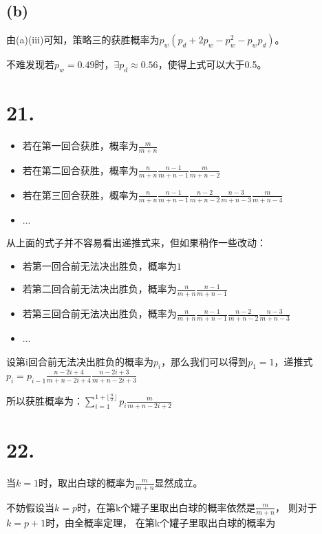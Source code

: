 \documentclass[UTF8]{article}
\begin{document}
        \subsection*{(b)}
            由(a)(iii)可知，策略三的获胜概率为$p_w(p_d + 2p_w - p_w^2 - p_wp_d)$。
            
            不难发现若$p_w = 0.49$时，$\exists p_d \approx 0.56$，使得上式可以大于0.5。
    \section*{21.}
        \begin{itemize}
            \item 若在第一回合获胜，概率为$\frac{m}{m + n}$
            \item 若在第二回合获胜，概率为$\frac{n}{m + n}\frac{n - 1}{m + n - 1}\frac{m}{m + n - 2}$
            \item 若在第三回合获胜，概率为$\frac{n}{m + n}\frac{n - 1}{m + n - 1}\frac{n - 2}{m + n - 2}\frac{n - 3}{m + n - 3}\frac{m}{m + n - 4}$
            \item ...
        \end{itemize}
        
        从上面的式子并不容易看出递推式来，但如果稍作一些改动：
        \begin{itemize}
            \item 若第一回合前无法决出胜负，概率为$1$
            \item 若第二回合前无法决出胜负，概率为$\frac{n}{m + n}\frac{n - 1}{m + n - 1}$
            \item 若第三回合前无法决出胜负，概率为$\frac{n}{m + n}\frac{n - 1}{m + n - 1}\frac{n - 2}{m + n - 2}\frac{n - 3}{m + n - 3}$
            \item ...
        \end{itemize}
        
        设第i回合前无法决出胜负的概率为$p_i$，那么我们可以得到$p_1 = 1$，递推式$p_i = p_{i - 1}\frac{n - 2i + 4}{m + n - 2i + 4}\frac{n - 2i + 3}{m + n -2i + 3}$

        所以获胜概率为：$\sum_{i = 1}^{1 + \lfloor \frac{n}{2} \rfloor}p_i \frac{m}{m + n - 2i + 2}$
    
    \section*{22.}
        当$k = 1$时，取出白球的概率为$\frac{m}{m + n}$显然成立。

        不妨假设当$k = p$时，在第k个罐子里取出白球的概率依然是$\frac{m}{m + n}$，
        则对于$k = p + 1$时，由全概率定理，
        在第k个罐子里取出白球的概率为
        
\end{document}
